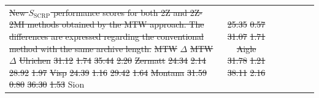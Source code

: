 \documentclass[hess, manuscript]{copernicus}
\providecommand{\DIFdel}[1]{{\protect\color{red}\sout{#1}}}                      %
\providecommand{\DIFdelFL}[1]{\DIFdel{#1}} %
\providecommand{\DIFdelbeginFL}{} %
\providecommand{\DIFdelendFL}{} %
\begin{document}
\begin{table}[htb]
\begin{center}
\begin{tabular}{l c c c c c c }
{%
\DIFdelFL{New $S_{\text{SCRP}}$ performance scores for both 2Z and 2Z-2MI methods obtained by the MTW approach. The differences are expressed regarding the conventional method with the same archive length.}}
\DIFdelFL{MTW }%
\DIFdelFL{$\Delta$ }%
\DIFdelFL{MTW }%
\DIFdelFL{$\Delta$ }%
\DIFdelFL{Ulrichen }%
\DIFdelFL{31.12 }%
\DIFdelFL{1.74 }%
\DIFdelFL{35.44 }%
\DIFdelFL{2.20 }%
\DIFdelFL{Zermatt }%
\DIFdelFL{24.34 }%
\DIFdelFL{2.14 }%
\DIFdelFL{28.92 }%
\DIFdelFL{1.97 }%
\DIFdelFL{Visp }%
\DIFdelFL{24.39 }%
\DIFdelFL{1.16 }%
\DIFdelFL{29.42 }%
\DIFdelFL{1.64 }%
\DIFdelFL{Montana }%
\DIFdelFL{31.59 }%
\DIFdelFL{0.80 }%
\DIFdelFL{36.30 }%
\DIFdelFL{1.53 }%
\DIFdelendFL Sion & \DIFdelbeginFL \DIFdelFL{25.35 }%
\DIFdelFL{0.57 }%
\DIFdelFL{31.07 }%
\DIFdelFL{1.71 }%
\DIFdelFL{Aigle }%
\DIFdelFL{31.78 }%
\DIFdelFL{1.21 }%
\DIFdelFL{38.11 }%
\DIFdelFL{2.16 }%


\end{tabular}
\end{center}
\end{table}
\end{document}
